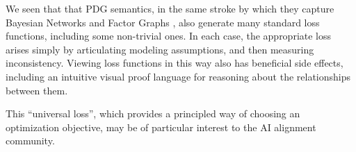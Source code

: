 \documentclass[twoside]{article}
\theoremstyle{plain}
\theoremstyle{definition}
\begin{document}
We seen that that PDG semantics, in the same stroke by which they capture Bayesian Networks and Factor Graphs \parencite{richardson2020probabilistic}, also generate
%
many standard loss functions, including some non-trivial ones.
In each case, the appropriate loss arises simply by articulating modeling assumptions, and then measuring inconsistency.
Viewing loss functions in this way also has beneficial side effects, including an intuitive visual proof language for reasoning about the relationships between them.

%
This ``universal loss'',
which provides a principled way of choosing an optimization objective,
may be of particular interest to the AI alignment community.
\end{document}
